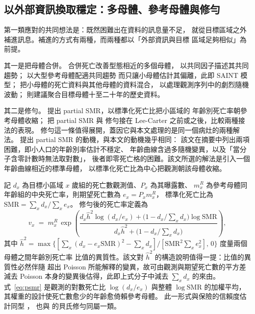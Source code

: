 
\subsection{以外部資訊換取穩定：多母體、參考母體與修勻}\label{sec:ref}

第一類應對的共同想法是：既然困難出在資料的訊息量不足，
就從目標區域之外補進訊息。補進的方式有兩種，而兩種都以「外部資訊與目標
區域足夠相似」為前提。

其一是把母體合併。\citet{lilee2005} 合併死亡改善型態相近的多個母體，
以共同因子描述其共同趨勢；\citet{jarner2011} 以大型參考母體配適共同趨勢
而只讓小母體估計其偏離，此即 SAINT 模型；
\citet{ahcan2014} 把小母體的死亡資料與其他母體的資料混合，
以處理觀測序列中的劇烈隨機波動；
\citet{wang2018} 則建議聚合目標母體十至二十年的歷史資料。

其二是修勻。\citet{lee2003} 提出 partial SMR，以標準化死亡比把小區域的
年齡別死亡率朝參考母體收縮；\citet{yue2019} 把 partial SMR 與
\citet{whittaker1923} 修勻接在 Lee-Carter 之前或之後，比較兩種接法的表現。
修勻這一條值得展開，蓋因它與本文處理的是同一個病灶的兩種解法。
\citet{lee2003} 提出 partial SMR 的動機，與本文的動機幾乎相同：
該文在摘要中列出兩項困難，即小人口的年齡別率估計不穩定、
年齡曲線含過多隨機變異，以及「當分子含零計數時無法取對數」，
後者即零死亡格的困難。該文所選的解法是引入一個年齡曲線相近的標準母體，
以標準化死亡比為中心把觀測朝該母體收縮。

記 $d_x$ 為目標小區域 $x$ 歲組的死亡數觀測值、$P_x$ 為其曝露數、
$m^R_x$ 為參考母體同年齡組的中央死亡率，則期望死亡數為 $e_x=P_x m^R_x$，
標準化死亡比為 $\mathrm{SMR}=\sum_x d_x\big/\sum_x e_x$。
修勻後的死亡率定義為
\begin{equation}\label{eq:psmr}
v_x \;=\; m^R_x\,\exp\!\left(
\frac{d_x\hat h^2\log(d_x/e_x)+\bigl(1-d_x/\textstyle\sum_x d_x\bigr)\log \mathrm{SMR}}
     {d_x\hat h^2+\bigl(1-d_x/\textstyle\sum_x d_x\bigr)}\right),
\end{equation}
其中 $\hat h^2=\max\bigl\{[\sum_x(d_x-e_x\mathrm{SMR})^2-\sum_x d_x]
\big/[\mathrm{SMR}^2\sum_x e_x^2],\,0\bigr\}$ 度量兩個母體之間年齡別死亡率
比值的異質性。該文對 $\hat h^2$ 的構造說明值得一提：比值的異質性必然伴隨
超出 Poisson 所能解釋的變異，故可由觀測與期望死亡數的平方差減去 Poisson
本身的變異後估得，此即上式分子中減去 $\sum_x d_x$ 的來由。
式~\eqref{eq:psmr} 是觀測的對數死亡比 $\log(d_x/e_x)$ 與整體
$\log\mathrm{SMR}$ 的加權平均，其權重的設計使死亡數愈少的年齡愈倚賴參考母體。
此一形式與保險的信賴度估計同型 \citep{klugman2012}，
也與 \citet{kimeldorf1967} 的貝氏修勻同屬一類。

